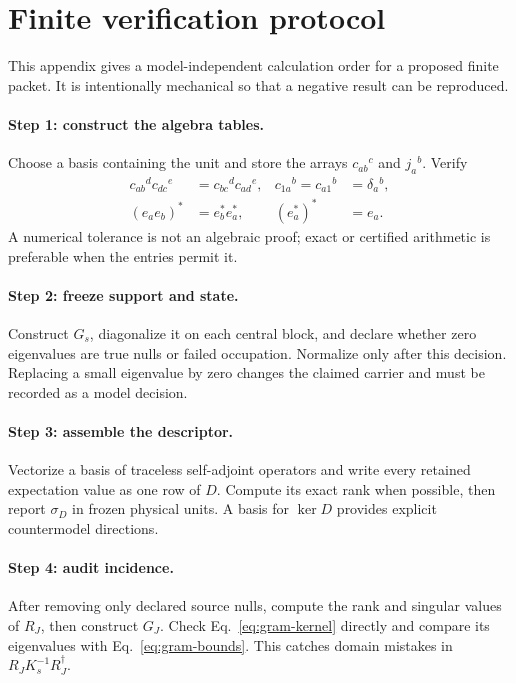 \documentclass[11pt]{article}
\begin{document}
\appendix
\section{Finite verification protocol}

This appendix gives a model-independent calculation order for a proposed
finite packet.  It is intentionally mechanical so that a negative result can
be reproduced.

\paragraph{Step 1: construct the algebra tables.}
Choose a basis containing the unit and store the arrays
\(c_{ab}{}^c\) and \(j_a{}^b\).  Verify
\begin{align}
 c_{ab}{}^dc_{dc}{}^e&=c_{bc}{}^dc_{ad}{}^e,
 & c_{1a}{}^b=c_{a1}{}^b&=\delta_a{}^b,\\
 (e_ae_b)^*&=e_b^*e_a^*,
 & (e_a^*)^*&=e_a.
\end{align}
A numerical tolerance is not an algebraic proof; exact or certified arithmetic
is preferable when the entries permit it.

\paragraph{Step 2: freeze support and state.}
Construct \(G_s\), diagonalize it on each central block, and declare whether
zero eigenvalues are true nulls or failed occupation.  Normalize only after
this decision.  Replacing a small eigenvalue by zero changes the claimed
carrier and must be recorded as a model decision.

\paragraph{Step 3: assemble the descriptor.}
Vectorize a basis of traceless self-adjoint operators and write every retained
expectation value as one row of \(D\).  Compute its exact rank when possible,
then report \(\sigma_D\) in frozen physical units.  A basis for \(\ker D\)
provides explicit countermodel directions.

\paragraph{Step 4: audit incidence.}
After removing only declared source nulls, compute the rank and singular values
of \(R_J\), then construct \(G_J\).  Check
Eq.~\eqref{eq:gram-kernel} directly and compare its eigenvalues with
Eq.~\eqref{eq:gram-bounds}.  This catches domain mistakes in
\(R_JK_s^{-1}R_J^\dagger\).
\end{document}
